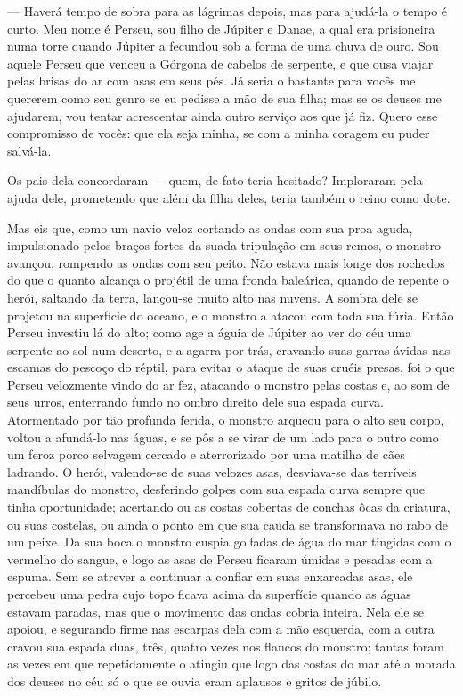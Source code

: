— Haverá tempo de sobra para as lágrimas depois, mas para ajudá-la o
tempo é curto. Meu nome é Perseu, sou filho de Júpiter e Danae, a
qual era prisioneira numa torre quando Júpiter a fecundou sob a forma
de uma chuva de ouro. Sou aquele Perseu que venceu a Górgona de
cabelos de serpente, e que ousa viajar pelas brisas do ar com asas em
seus pés. Já seria o bastante para vocês me quererem como seu genro
se eu pedisse a mão de sua filha; mas se os deuses me ajudarem, vou
tentar acrescentar ainda outro serviço aos que já fiz. Quero esse
compromisso de vocês: que ela seja minha, se com a minha coragem eu
puder salvá-la.

Os pais dela concordaram — quem, de fato teria hesitado? Imploraram
pela ajuda dele, prometendo que além da filha deles, teria também o
reino como dote. 

Mas eis que, como um navio veloz cortando as ondas com sua proa aguda,
impulsionado pelos braços fortes da suada tripulação em seus remos, o
monstro avançou, rompendo as ondas com seu peito. Não estava mais
longe dos rochedos do que o quanto alcança o projétil de uma fronda
baleárica, quando de repente o herói, saltando da terra, lançou-se
muito alto nas nuvens. A sombra dele se projetou na superfície do
oceano, e o monstro a atacou com toda sua fúria. Então Perseu
investiu lá do alto; como age a águia de Júpiter ao ver do céu uma
serpente ao sol num deserto, e a agarra por trás, cravando suas
garras ávidas nas escamas do pescoço do réptil, para evitar o ataque
de suas cruéis presas, foi o que Perseu velozmente vindo do ar fez,
atacando o monstro pelas costas e, ao som de seus urros, enterrando
fundo no ombro direito dele sua espada curva. Atormentado por tão
profunda ferida, o monstro arqueou para o alto seu corpo, voltou a
afundá-lo nas águas, e se pôs a se virar de um lado para o outro como
um feroz porco selvagem cercado e aterrorizado por uma matilha de
cães ladrando. O herói, valendo-se de suas velozes asas, desviava-se
das terríveis mandíbulas do monstro, desferindo golpes com sua espada
curva sempre que tinha oportunidade; acertando ou as costas cobertas
de conchas ôcas da criatura, ou suas costelas, ou ainda o ponto em
que sua cauda se transformava no rabo de um peixe. Da sua boca o
monstro cuspia golfadas de água do mar tingidas com o vermelho do
sangue, e logo as asas de Perseu ficaram úmidas e pesadas com a
espuma. Sem se atrever a continuar a confiar em suas enxarcadas asas,
ele percebeu uma pedra cujo topo ficava acima da superfície quando as
águas estavam paradas, mas que o movimento das ondas cobria inteira.
Nela ele se apoiou, e segurando firme nas escarpas dela com a mão
esquerda, com a outra cravou sua espada duas, três, quatro vezes nos
flancos do monstro; tantas foram as vezes em que repetidamente o
atingiu que logo das costas do mar até a morada dos deuses no céu só
o que se ouvia eram aplausos e gritos de júbilo.

